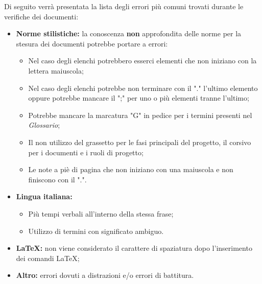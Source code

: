 Di seguito verrà presentata la lista degli errori più comuni trovati durante le verifiche dei documenti:
\begin{itemize}
	\item \textbf{Norme stilistiche:} la conoscenza \textbf{non} approfondita delle norme per la stesura dei documenti potrebbe portare a errori:
		\begin{itemize}
			\item Nel caso degli elenchi potrebbero esserci elementi che non iniziano con la lettera maiuscola;
			\item Nel caso degli elenchi potrebbe non terminare con il "." l'ultimo elemento oppure potrebbe mancare il ";" per uno o più elementi tranne l'ultimo; 
			\item Potrebbe mancare la marcatura "G" in pedice per i termini presenti nel \textit{Glossario};
			\item Il non utilizzo del grassetto per le fasi principali del progetto, il corsivo per i documenti e i ruoli di progetto;
			\item Le note a piè di pagina che non iniziano con una maiuscola e non finiscono con il ".".
		\end{itemize}
	\item \textbf{Lingua italiana:} 
		\begin{itemize}
			\item Più tempi verbali all'interno della stessa frase;
			\item Utilizzo di termini con significato ambiguo.
		\end{itemize}
	\item \textbf{\LaTeX:} non viene considerato il carattere di spaziatura dopo l'inserimento dei  comandi \LaTeX;
	\item \textbf{Altro:} errori dovuti a distrazioni e/o errori di battitura.
\end{itemize}

